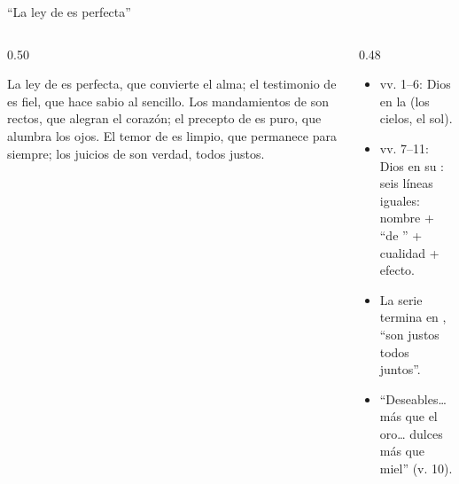 \begin{frame}{``La ley de \SENOR{} es perfecta''}
\begin{columns}[c,onlytextwidth]
\begin{column}{0.50\textwidth}
\begin{cita}La ley de \SENOR{} es perfecta, que convierte el alma; el testimonio de \SENOR{} es fiel, que hace sabio al sencillo. Los mandamientos de \SENOR{} son rectos, que alegran el corazón; el precepto de \SENOR{} es puro, que alumbra los ojos. El temor de \SENOR{} es limpio, que permanece para siempre; los juicios de \SENOR{} son verdad, todos justos.\end{cita}
\end{column}
\begin{column}{0.48\textwidth}\small
\begin{itemize}
\item vv. 1--6: Dios en la  (los cielos, el sol).
\item vv. 7--11: Dios en su : seis líneas iguales: nombre + ``de \SENOR'' + cualidad + efecto.
\item La serie termina en , ``son justos todos juntos''.
\item ``Deseables\ldots{} más que el oro\ldots{} dulces más que miel'' (v. 10).
\end{itemize}
\end{column}
\end{columns}
\end{frame}

